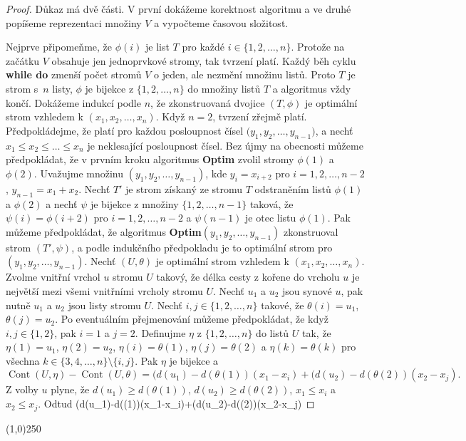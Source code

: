 \documentclass[a4paper,12pt]{article}
\newenvironment{myproof}{
  \begin{proof}
    
  }{
  \end{proof}
  \begin{center}
   \line(1,0){250}
   \end{center}
  }
\DeclareMathOperator*{\Cont}{Cont}
\begin{document}
\begin{myproof}Důkaz má dvě části. V 
první dokážeme korektnost algoritmu a ve druhé popíšeme 
reprezentaci množiny $V$ a vypočteme časovou složitost.

Nejprve připomeňme, že $\phi (i)$ je list $T$ 
pro každé $i\in \{1,2,\dots,n\}$.  Protože na začátku $
V$ 
obsahuje jen 
jednoprvko\-vé stromy, tak tvrzení platí.  Každý běh cyklu 
{\bf while do} zmenší počet stromů $V$ o jeden, ale nezmění 
množinu listů.  Proto $T$ je strom s~$n$ listy, $\phi$ je 
bijekce z $\{1,2,\dots,n\}$ do množiny listů $T$ a algoritmus 
vždy končí.  Dokážeme indukcí podle $n$, že zkonstruovaná 
dvojice $(T,\phi )$ je optimální strom vzhledem k $(x_1,x_2
,\dots,x_n)$.  
Když $n=2$, tvrzení zřejmě platí.  Předpokládejme, že 
platí pro každou posloupnost čísel $(y_1,y_2,\dots,$$
y_{n-1})$, a 
nechť $x_1\le x_2\le\dots\le x_n$ je neklesající posloupnost čísel.  Bez újmy na 
obecnosti můžeme předpokládat, že v prvním kroku 
algoritmus {\bf Optim} zvolil stromy $\phi (1)$ a $\phi (2)$.  Uvažujme množinu 
$(y_1,y_2,\dots,y_{n-1})$, kde $y_i=x_{i+2}$ pro $i=1,2,\dots,n-2$, 
$y_{n-1}=x_1+x_2$.  Nechť $T'$ je strom získaný ze stromu $
T$  
odstraněním listů $\phi (1)$ a $\phi (2)$ a nechť $
\psi$ je bijekce z 
množiny $\{1,2,\dots,n-1\}$ taková, že $\psi (i)=\phi (i+
2)$ pro 
$i=1,2,\dots,n-2$ a $\psi (n-1)$ je otec listu $\phi (1)$.  Pak 
můžeme předpokládat, že algoritmus 
{\bf Optim$(y_1,y_2,\dots,y_{n-1})$} zkonstruoval strom $(T',\psi 
)$, a podle indukčního 
předpokladu je to optimální strom pro $(y_1,y_2,\dots,y_{
n-1})$.  Nechť 
$(U,\theta )$ je optimální strom vzhledem k $(x_1,x_2,\dots
,x_n)$.  Zvolme 
vnitřní vrchol $u$ stromu $U$ takový, že délka cesty z kořene 
do vrcholu $u$ je nej\-větší mezi všemi vnitřními vrcholy 
stromu $U$.  Nechť $u_1$ a $u_2$ jsou synové $u$, pak nutně $
u_1$ 
a $u_2$ jsou listy stromu $U$.  Nechť $i,j\in \{1,2,\dots,n\}$ takové, že 
$\theta (i)=u_1$, $\theta (j)=u_2$.  Po eventuálním přejmenování můžeme 
předpokládat, že když $i,j\in \{1,2\}$, pak $i=1$ a 
$j=2$.  Definujme $\eta$ z $\{1,2,\dots,n\}$ do listů $U$ tak, že 
$\eta (1)=u_1$, $\eta (2)=u_2$, $\eta (i)=\theta (1)$, $\eta (j)=
\theta (2)$ a $\eta (k)=\theta (k)$ pro 
všechna $k\in \{3,4,\dots,n\}\setminus \{i,j\}$.  Pak $\eta$ je bijekce a 
$$\Cont(U,\eta )-\Cont(U,\theta )=(d(u_1)-d(\theta (1))(x_1-x_i)+
(d(u_2)-d(\theta (2))(x_2-x_j).$$
Z volby $u$ plyne, že $d(u_1)\ge d(\theta (1))$, $d(u_2)\ge d(
\theta (2))$, 
$x_1\le x_i$ a $x_2\le x_j$. Odtud  
$$(d(u_1)-d(\theta (1))(x_1-x_i)+(d(u_2)-d(\theta (2))(x_2-x_j)\le 

\end{myproof}
\end{document}
